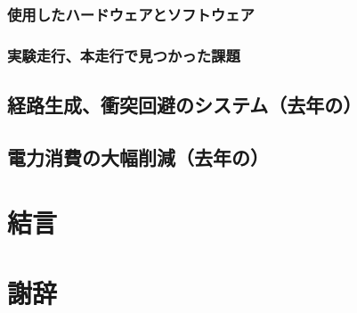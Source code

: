 \documentclass[twocolumn,9pt]{jsproceedings}
\begin{document}
\subsubsection{使用したハードウェアとソフトウェア}


\subsubsection{実験走行、本走行で見つかった課題}

\paragraph{}

\subsection{経路生成、衝突回避のシステム（去年の）}

\subsection{電力消費の大幅削減（去年の）}

\section{結言}

\section*{謝辞}

\end{document}
